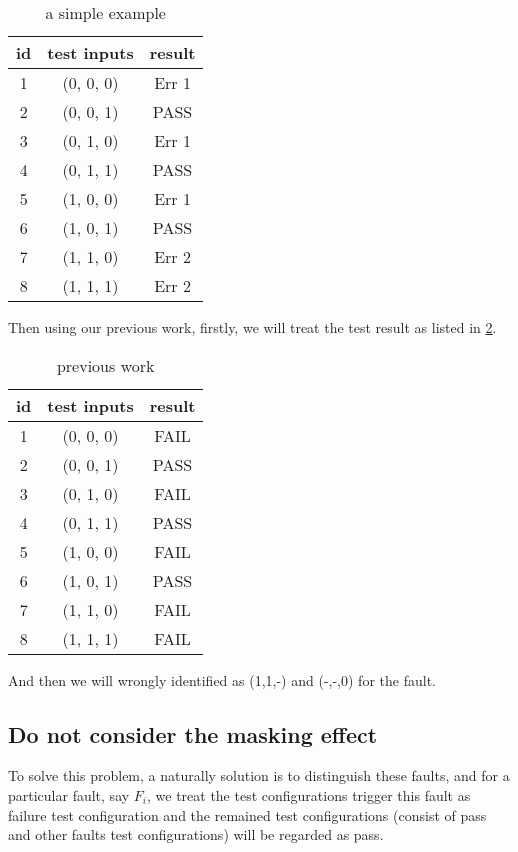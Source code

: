 \documentclass{sig-alternate}
\begin{document}
\begin{table}
\centering
\caption{a simple example}
\label{example_first_scenario}
\begin{tabular}{|c|c|c|} \hline
id&test inputs & result\\\hline
1&(0, 0, 0) &  Err 1\\ \hline
2&(0, 0, 1) &  PASS\\ \hline
3&(0, 1, 0) &  Err 1\\ \hline
4&(0, 1, 1) &  PASS\\ \hline
5&(1, 0, 0) &  Err 1\\ \hline
6&(1, 0, 1) &  PASS\\ \hline
7&(1, 1, 0) &  Err 2\\ \hline
8&(1, 1, 1) &  Err 2\\ \hline
\hline\end{tabular}
\end{table}

Then using our previous work, firstly, we will treat the test result as listed in \ref{previous_work}.

\begin{table}
\centering
\caption{previous work}
\label{previous_work}
\begin{tabular}{|c|c|c|} \hline
id&test inputs & result\\ \hline
1&(0, 0, 0) &  FAIL\\ \hline
2&(0, 0, 1) &  PASS\\ \hline
3&(0, 1, 0) &  FAIL\\ \hline
4&(0, 1, 1) &  PASS\\ \hline
5&(1, 0, 0) &  FAIL\\ \hline
6&(1, 0, 1) &  PASS\\ \hline
7&(1, 1, 0) &  FAIL\\ \hline
8&(1, 1, 1) &  FAIL\\ \hline
\hline\end{tabular}
\end{table}

And then we will wrongly identified as (1,1,-) and (-,-,0) for the fault.

\subsection{Do not consider the masking effect}

To solve this problem, a naturally solution is to distinguish these faults, and for a particular fault, say $F_{i}$, we treat the test configurations trigger this fault as failure test configuration and the remained test configurations (consist of pass and other faults test configurations) will be regarded as pass.
\end{document}
